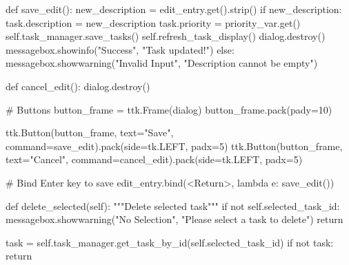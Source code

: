 \documentclass[
  letterpaper,
  DIV=11,
  numbers=noendperiod,
  oneside]{scrreprt}
\newenvironment{Shaded}{}{}
\newcommand{\CommentTok}[1]{\textcolor[rgb]{0.42,0.45,0.49}{#1}}
\newcommand{\ControlFlowTok}[1]{\textcolor[rgb]{0.84,0.23,0.29}{#1}}
\newcommand{\DecValTok}[1]{\textcolor[rgb]{0.00,0.36,0.77}{#1}}
\newcommand{\KeywordTok}[1]{\textcolor[rgb]{0.84,0.23,0.29}{#1}}
\newcommand{\NormalTok}[1]{\textcolor[rgb]{0.14,0.16,0.18}{#1}}
\newcommand{\OperatorTok}[1]{\textcolor[rgb]{0.14,0.16,0.18}{#1}}
\newcommand{\StringTok}[1]{\textcolor[rgb]{0.01,0.18,0.38}{#1}}
\newcommand{\VariableTok}[1]{\textcolor[rgb]{0.89,0.38,0.04}{#1}}
\begin{document}
\begin{Shaded}
\begin{Highlighting}[]
        \KeywordTok{def}\NormalTok{ save\_edit():}
\NormalTok{            new\_description }\OperatorTok{=}\NormalTok{ edit\_entry.get().strip()}
            \ControlFlowTok{if}\NormalTok{ new\_description:}
\NormalTok{                task.description }\OperatorTok{=}\NormalTok{ new\_description}
\NormalTok{                task.priority }\OperatorTok{=}\NormalTok{ priority\_var.get()}
                \VariableTok{self}\NormalTok{.task\_manager.save\_tasks()}
                \VariableTok{self}\NormalTok{.refresh\_task\_display()}
\NormalTok{                dialog.destroy()}
\NormalTok{                messagebox.showinfo(}\StringTok{"Success"}\NormalTok{, }\StringTok{"Task updated!"}\NormalTok{)}
            \ControlFlowTok{else}\NormalTok{:}
\NormalTok{                messagebox.showwarning(}\StringTok{"Invalid Input"}\NormalTok{, }\StringTok{"Description cannot be empty"}\NormalTok{)}
        
        \KeywordTok{def}\NormalTok{ cancel\_edit():}
\NormalTok{            dialog.destroy()}
        
        \CommentTok{\# Buttons}
\NormalTok{        button\_frame }\OperatorTok{=}\NormalTok{ ttk.Frame(dialog)}
\NormalTok{        button\_frame.pack(pady}\OperatorTok{=}\DecValTok{10}\NormalTok{)}
        
\NormalTok{        ttk.Button(button\_frame, text}\OperatorTok{=}\StringTok{"Save"}\NormalTok{, command}\OperatorTok{=}\NormalTok{save\_edit).pack(side}\OperatorTok{=}\NormalTok{tk.LEFT, padx}\OperatorTok{=}\DecValTok{5}\NormalTok{)}
\NormalTok{        ttk.Button(button\_frame, text}\OperatorTok{=}\StringTok{"Cancel"}\NormalTok{, command}\OperatorTok{=}\NormalTok{cancel\_edit).pack(side}\OperatorTok{=}\NormalTok{tk.LEFT, padx}\OperatorTok{=}\DecValTok{5}\NormalTok{)}
        
        \CommentTok{\# Bind Enter key to save}
\NormalTok{        edit\_entry.bind(}\StringTok{\textquotesingle{}\textless{}Return\textgreater{}\textquotesingle{}}\NormalTok{, }\KeywordTok{lambda}\NormalTok{ e: save\_edit())}
    
    \KeywordTok{def}\NormalTok{ delete\_selected(}\VariableTok{self}\NormalTok{):}
        \CommentTok{"""Delete selected task"""}
        \ControlFlowTok{if} \KeywordTok{not} \VariableTok{self}\NormalTok{.selected\_task\_id:}
\NormalTok{            messagebox.showwarning(}\StringTok{"No Selection"}\NormalTok{, }\StringTok{"Please select a task to delete"}\NormalTok{)}
            \ControlFlowTok{return}
        
\NormalTok{        task }\OperatorTok{=} \VariableTok{self}\NormalTok{.task\_manager.get\_task\_by\_id(}\VariableTok{self}\NormalTok{.selected\_task\_id)}
        \ControlFlowTok{if} \KeywordTok{not}\NormalTok{ task:}
            \ControlFlowTok{return}
        

\end{Highlighting}
\end{Shaded}
\end{document}
